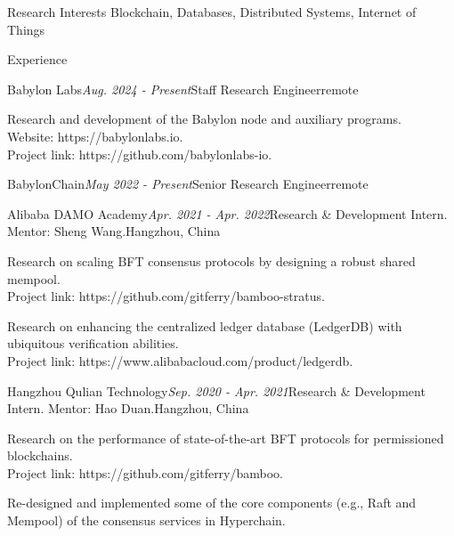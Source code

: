 \documentclass{resume} %
\begin{document}
\begin{rSection}{Research Interests}
Blockchain, Databases, Distributed Systems, Internet of Things
\end{rSection}


\begin{rSection}{Experience}

\begin{rSubsection}{Babylon Labs}{\em Aug. 2024 - Present}{Staff Research Engineer}{remote}
\item Research and development of the Babylon node and auxiliary programs.
\\Website: https://babylonlabs.io.
\\Project link: https://github.com/babylonlabs-io.
\end{rSubsection}

\begin{rSubsection}{BabylonChain}{\em May 2022 - Present}{Senior Research Engineer}{remote}
\end{rSubsection}

\begin{rSubsection}{Alibaba DAMO Academy}{\em Apr. 2021 - Apr. 2022}{Research \& Development Intern. Mentor: Sheng Wang.}{Hangzhou, China}
\item Research on scaling BFT consensus protocols by designing a robust shared mempool.
\\Project link: https://github.com/gitferry/bamboo-stratus.
\item Research on enhancing the centralized ledger database (LedgerDB) with ubiquitous verification abilities.
\\Project link: https://www.alibabacloud.com/product/ledgerdb.
\end{rSubsection}


\begin{rSubsection}{Hangzhou Qulian Technology}{\em Sep. 2020 - Apr. 2021}{Research \& Development Intern. Mentor: Hao Duan.}{Hangzhou, China}
\item Research on the performance of state-of-the-art BFT protocols for permissioned blockchains.
\\Project link: https://github.com/gitferry/bamboo.
\item Re-designed and implemented some of the core components (e.g., Raft and Mempool) of the consensus services in Hyperchain.
\end{rSubsection}


\end{rSection}
\end{document}
